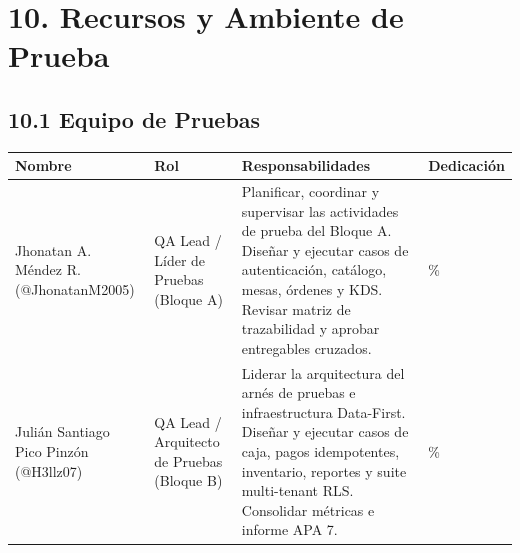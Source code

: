 \documentclass[10pt,a4paper]{article}
\newcounter{none}
\begin{document}

\section{10. Recursos y Ambiente de Prueba}\label{10-recursos-y-ambiente-de-prueba}


\subsection{10.1 Equipo de Pruebas}\label{101-equipo-de-pruebas}

\begingroup\singlespacing\footnotesize\setlength{\parskip}{0pt}

{\def\LTcaptype{none} %
\begin{longtable}[]{@{}
  >{\raggedright\arraybackslash}p{}
  >{\raggedright\arraybackslash}p{}
  >{\raggedright\arraybackslash}p{}
  >{\raggedright\arraybackslash}p{}@{}}
\toprule\noalign{}
\begin{minipage}[b]{\linewidth}\raggedright
Nombre
\end{minipage} & \begin{minipage}[b]{\linewidth}\raggedright
Rol
\end{minipage} & \begin{minipage}[b]{\linewidth}\raggedright
Responsabilidades
\end{minipage} & \begin{minipage}[b]{\linewidth}\raggedright
Dedicación
\end{minipage} \\
\midrule\noalign{}
\endhead
\bottomrule\noalign{}
\endlastfoot
Jhonatan A. Méndez R. (@JhonatanM2005) & QA Lead / Líder de Pruebas (Bloque A) & Planificar, coordinar y supervisar las actividades de prueba del Bloque A. Diseñar y ejecutar casos de autenticación, catálogo, mesas, órdenes y KDS. Revisar matriz de trazabilidad y aprobar entregables cruzados. & 100\% \\
Julián Santiago Pico Pinzón (@H3llz07) & QA Lead / Arquitecto de Pruebas (Bloque B) & Liderar la arquitectura del arnés de pruebas e infraestructura Data-First. Diseñar y ejecutar casos de caja, pagos idempotentes, inventario, reportes y suite multi-tenant RLS. Consolidar métricas e informe APA 7. & 100\% \\

\end{longtable}}
\end{document}
